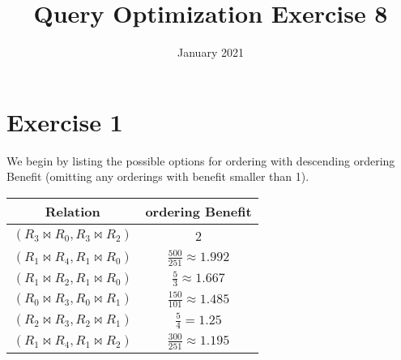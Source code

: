 \documentclass{article}
\title{Query Optimization Exercise 8}
\date{January 2021}
\begin{document}
\maketitle

\section{Exercise 1}
We begin by listing the possible options for ordering with descending ordering Benefit (omitting any orderings with benefit smaller than 1).
\begin{center}
\begin{tabular}{c|c}
Relation & ordering Benefit \\ \hline
$(R_3 \bowtie R_0, R_3 \bowtie R_2)$ & 2 \\
$(R_1 \bowtie R_4, R_1 \bowtie R_0)$ & $\frac{500}{251} \approx 1.992$ \\
$(R_1 \bowtie R_2, R_1 \bowtie R_0)$ & $\frac{5}{3} \approx 1.667$ \\
$(R_0 \bowtie R_3, R_0 \bowtie R_1)$ & $\frac{150}{101} \approx 1.485$ \\
$(R_2 \bowtie R_3, R_2 \bowtie R_1)$ & $\frac{5}{4} = 1.25$ \\
$(R_1 \bowtie R_4, R_1 \bowtie R_2)$ & $\frac{300}{251} \approx 1.195$
\end{tabular}
\end{center}

\end{document}
